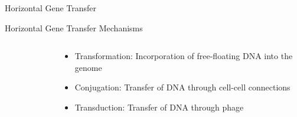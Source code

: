 \documentclass[dvipsnames]{beamer}
\begin{document}
\begin{frame}{}%
    \begin{center}
        \Huge \textcolor{OliveGreen}{Horizontal Gene Transfer}
    \end{center}
    \addtocounter{framenumber}{-1}
\end{frame}
\begin{frame}[fragile]{Horizontal Gene Transfer Mechanisms}
    \begin{columns}
    \begin{column}{0.5\textwidth}
        \begin{figure}[htb!]
            \autocite{trendslgt}
        \end{figure}
    \end{column}
    \begin{column}{0.5\textwidth}
        \begin{itemize}
            \item<2-> Transformation: Incorporation of free-floating DNA into the genome \autocite{trendslgt}
            \item<3-> Conjugation: Transfer of DNA through cell-cell connections \autocite{trendslgt}
            \item<4-> Transduction: Transfer of DNA through phage \autocite{trendslgt}
        \end{itemize}
    \end{column}
    \end{columns}
\end{frame}
\end{document}
